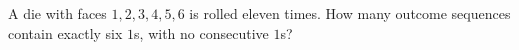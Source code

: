 A die with faces $1,2,3,4,5,6$ is rolled eleven times. How many outcome sequences contain exactly six $1$s, with no consecutive $1$s?
